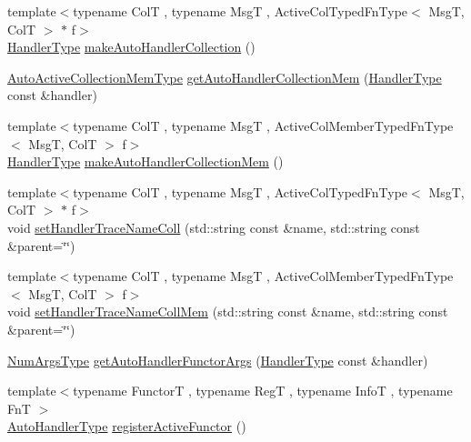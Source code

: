 \begin{DoxyCompactItemize}
{\footnotesize template$<$typename ColT , typename MsgT , Active\+Col\+Typed\+Fn\+Type$<$ Msg\+T, Col\+T $>$ $\ast$ f$>$ }\\\hyperlink{namespacevt_af64846b57dfcaf104da3ef6967917573}{Handler\+Type} \hyperlink{namespacevt_1_1auto__registry_aaba50e36f081bdaf661f1571a6599551}{make\+Auto\+Handler\+Collection} ()
\item 
\hyperlink{namespacevt_1_1auto__registry_aa217123c03472f9bcee51300d638b16e}{Auto\+Active\+Collection\+Mem\+Type} \hyperlink{namespacevt_1_1auto__registry_a7bcd3d732e686be4d6ab5501f6fb8dc3}{get\+Auto\+Handler\+Collection\+Mem} (\hyperlink{namespacevt_af64846b57dfcaf104da3ef6967917573}{Handler\+Type} const \&handler)
\item 
{\footnotesize template$<$typename ColT , typename MsgT , Active\+Col\+Member\+Typed\+Fn\+Type$<$ Msg\+T, Col\+T $>$ f$>$ }\\\hyperlink{namespacevt_af64846b57dfcaf104da3ef6967917573}{Handler\+Type} \hyperlink{namespacevt_1_1auto__registry_a495c63ee09b75f019a6b86957806a417}{make\+Auto\+Handler\+Collection\+Mem} ()
\item 
{\footnotesize template$<$typename ColT , typename MsgT , Active\+Col\+Typed\+Fn\+Type$<$ Msg\+T, Col\+T $>$ $\ast$ f$>$ }\\void \hyperlink{namespacevt_1_1auto__registry_a2532642e28246a717542b6a62aa8e37a}{set\+Handler\+Trace\+Name\+Coll} (std\+::string const \&name, std\+::string const \&parent=\char`\"{}\char`\"{})
\item 
{\footnotesize template$<$typename ColT , typename MsgT , Active\+Col\+Member\+Typed\+Fn\+Type$<$ Msg\+T, Col\+T $>$ f$>$ }\\void \hyperlink{namespacevt_1_1auto__registry_a409d348d2435acd9ce36a38c12d13322}{set\+Handler\+Trace\+Name\+Coll\+Mem} (std\+::string const \&name, std\+::string const \&parent=\char`\"{}\char`\"{})
\item 
\hyperlink{namespacevt_1_1auto__registry_aebda1d9d765bc9147dc654ad0712c936}{Num\+Args\+Type} \hyperlink{namespacevt_1_1auto__registry_ae68422e2a7b216e19bc16988400b0d47}{get\+Auto\+Handler\+Functor\+Args} (\hyperlink{namespacevt_af64846b57dfcaf104da3ef6967917573}{Handler\+Type} const \&handler)
\item 
{\footnotesize template$<$typename FunctorT , typename RegT , typename InfoT , typename FnT $>$ }\\\hyperlink{namespacevt_1_1auto__registry_ae295e18699146815bb7d7674594d95d7}{Auto\+Handler\+Type} \hyperlink{namespacevt_1_1auto__registry_ab7e130e8790e4df4dc1d35476d1736e0}{register\+Active\+Functor} ()

\end{DoxyCompactItemize}
